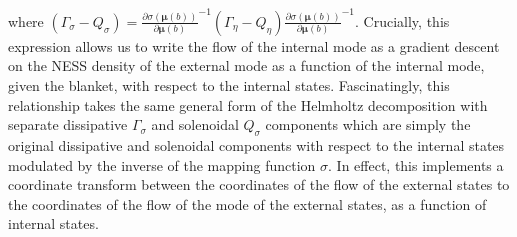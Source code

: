 where $(\Gamma_\sigma - Q_\sigma) = \frac{\partial \sigma(\bm{\mu}(b))}{\partial \bm{\mu}(b)}^{-1} (\Gamma_\eta - Q_\eta) \frac{\partial \sigma(\bm{\mu}(b))}{\partial \bm{\mu}(b)}^{-1}$. Crucially, this expression allows us to write the flow of the internal mode as a gradient descent on the NESS density of the external mode as a function of the internal mode, given the blanket, with respect to the internal states. Fascinatingly, this relationship takes the same general form of the Helmholtz decomposition with separate dissipative $\Gamma_\sigma$ and solenoidal $Q_\sigma$ components which are simply the original dissipative and solenoidal components with respect to the internal states modulated by the inverse of the mapping function $\sigma$. In effect, this implements a coordinate transform between the coordinates of the flow of the external states to the coordinates of the flow of the mode of the external states, as a function of internal states.

